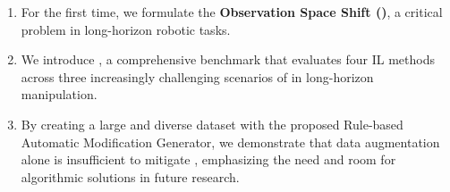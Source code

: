 \begin{enumerate}%
    
    \item For the first time, we formulate the \textbf{Observation Space Shift (\pb)}, a critical problem in long-horizon robotic tasks.
    
    \item We introduce \bm, a comprehensive benchmark that evaluates four IL methods across three increasingly challenging scenarios of \pb in long-horizon manipulation.
    
    \item By creating a large and diverse dataset with the proposed Rule-based Automatic Modification Generator, we demonstrate that data augmentation alone is insufficient to mitigate \pb, emphasizing the need and room for algorithmic solutions in future research.
\end{enumerate}

